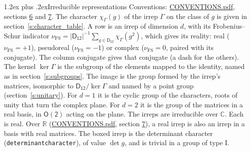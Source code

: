 \documentclass[10pt,a4paper]{article}
\makeatletter
\renewcommand\section{\@startsection{section}{1}{\z@}{-3ex plus -1ex minus -.2ex}%
  {1.2ex plus .2ex}{\normalfont\large\sffamily\bfseries\color{parttitle}}}
\numberwithin{equation}{section}
\newcommand{\grp}[1]{\mathsf{#1}}
\newcommand{\irchar}[1]{\chi_{#1}}
\newcommand{\fsind}{\nu_{\mathrm{FS}}}
\makeatother
\begin{document}
\section{Irreducible representations}\label{s:irreps}
Conventions: \href{../../CONVENTIONS.pdf}{CONVENTIONS.pdf}, sections \href{../../CONVENTIONS.pdf\#conv.6}{6} and \href{../../CONVENTIONS.pdf\#conv.7}{7}.
\leavevmode\label{n:function.character}\label{n:irrep.Gamma}The character $\irchar{\Gamma}(g)$ of the irrep $\Gamma$ on the class of $g$ is given in section~\ref{s:character_table}.
\leavevmode\label{n:index.dimension}\label{n:index.frobenius}\label{n:head.irrep}\label{n:head.reality}A row is an irrep of dimension $d$, with its Frobenius--Schur indicator $\fsind = |\grp{D_{12}}|^{-1}\allowbreak\sum_{g\in\grp{D_{12}}}\irchar{\Gamma}(g^2)$, which gives its reality: real ($\fsind = +1$), pseudoreal ($\fsind = -1$) or complex ($\fsind = 0$, paired with its conjugate). \label{n:head.conjugate}The column conjugate gives that conjugate (a dash for the others). \label{n:head.kernel}The kernel $\ker\Gamma$ is the subgroup of the elements mapped to the identity, named as in section~\ref{s:subgroups}. \label{n:head.image}The image is the group formed by the irrep's matrices, isomorphic to $\grp{D_{12}}/\ker\Gamma$ and named by a point group (section~\ref{s:unitary}). For $d = 1$ it is the cyclic group of the characters, roots of unity that turn the complex plane. For $d = 2$ it is the group of the matrices in a real basis, in $\grp{O(2)}$ acting on the plane. The irreps are irreducible over $\mathbb{C}$. Each is real. Over $\mathbb{R}$ (\href{../../CONVENTIONS.pdf}{CONVENTIONS.pdf}, section \href{../../CONVENTIONS.pdf\#conv.7}{7}), a real irrep is also an irrep in a basis with real matrices. \label{n:mark.determinant}The boxed irrep is the determinant character (\texttt{determinantcharacter}), of value $\det g$, and is trivial in a group of type I.
\setlength{\emergencystretch}{2em}\par\setlength{\emergencystretch}{0pt}
\end{document}
